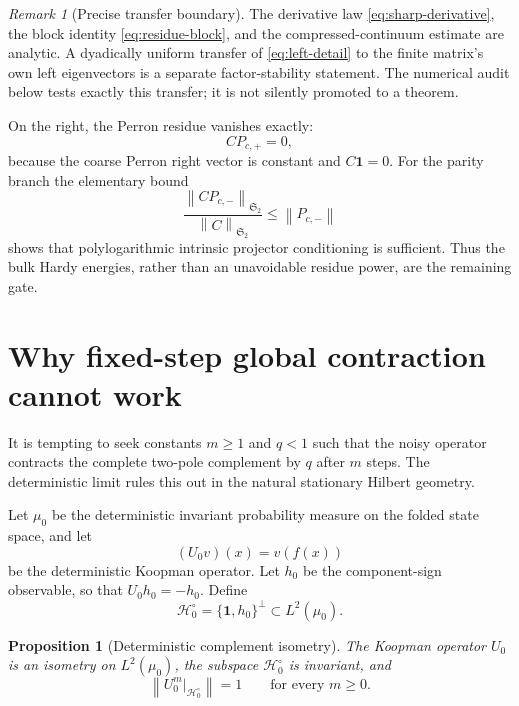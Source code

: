 \documentclass[11pt]{article}
\newtheorem{proposition}[theorem]{Proposition}
\theoremstyle{definition}
\theoremstyle{remark}
\newtheorem{remark}[theorem]{Remark}
\newcommand{\cH}{\mathcal H}
\newcommand{\HS}{\mathfrak S_2}
\newcommand{\norm}[1]{\left\lVert #1\right\rVert}
\begin{document}
\begin{remark}[Precise transfer boundary]
The derivative law \eqref{eq:sharp-derivative}, the block identity
\eqref{eq:residue-block}, and the compressed-continuum estimate are
analytic.  A dyadically uniform transfer of \eqref{eq:left-detail} to the
finite matrix's own left eigenvectors is a separate factor-stability
statement.  The numerical audit below tests exactly this transfer; it is not
silently promoted to a theorem.
\end{remark}

On the right, the Perron residue vanishes exactly:
\begin{equation}
 CP_{c,+}=0,
 \label{eq:right-perron-zero}
\end{equation}
because the coarse Perron right vector is constant and
\(C\mathbf1=0\).  For the parity branch the elementary bound
\begin{equation}
 \frac{\norm{CP_{c,-}}_{\HS}}{\norm C_{\HS}}
 \le\norm{P_{c,-}}
 \label{eq:right-parity-projector}
\end{equation}
shows that polylogarithmic intrinsic projector conditioning is sufficient.
Thus the bulk Hardy energies, rather than an unavoidable residue power, are
the remaining gate.

\section{Why fixed-step global contraction cannot work}
\label{sec:no-go}

It is tempting to seek constants \(m\ge1\) and \(q<1\) such that the noisy
operator contracts the complete two-pole complement by \(q\) after \(m\)
steps.  The deterministic limit rules this out in the natural stationary
Hilbert geometry.

Let \(\mu_0\) be the deterministic invariant probability measure on the
folded state space, and let
\begin{equation}
 (U_0v)(x)=v(f(x))
 \label{eq:koopman}
\end{equation}
be the deterministic Koopman operator.  Let \(h_0\) be the component-sign
observable, so that \(U_0h_0=-h_0\).  Define
\begin{equation}
 \cH_0^\circ
 =
 \{\mathbf1,h_0\}^{\perp}
 \subset L^2(\mu_0).
 \label{eq:H0}
\end{equation}

\begin{proposition}[Deterministic complement isometry]
\label{prop:isometry}
The Koopman operator \(U_0\) is an isometry on \(L^2(\mu_0)\), the subspace
\(\cH_0^\circ\) is invariant, and
\begin{equation}
 \norm{U_0^m|_{\cH_0^\circ}}=1
 \qquad\text{for every }m\ge0.
 \label{eq:isometry-complement}
\end{equation}
\end{proposition}
\end{document}
